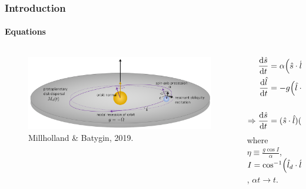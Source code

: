\documentclass[dvipsnames]{beamer}
\newcommand*{\rd}[2]{\frac{\mathrm{d}#1}{\mathrm{d}#2}}
\DeclarePairedDelimiter\p{\lparen}{\rparen}
\begin{document}
\begin{frame}
    \frametitle{Introduction}
    \framesubtitle{Equations}

    \begin{columns}
        \begin{column}{0.5\textwidth}
            \begin{figure}[t]
                \centering
                \includegraphics[width=\textwidth]{../GM_190913/1millholland_disk.png}
                \caption{Millholland \& Batygin, 2019.}
            \end{figure}
        \end{column}
        \begin{column}{0.5\textwidth}
            \begin{align*}
                \rd{\hat{s}}{t} &= \alpha \p*{\hat{s} \cdot \hat{l}_d}
                    \p*{\hat{s} \times \hat{l}_d},\\
                \rd{\hat{l}}{t} &= -g\p*{\hat{l} \cdot \hat{l}_d}
                    \p*{\hat{l} \times \hat{l}_d},\\
                \\
                \Rightarrow \rd{\hat{s}}{t}
                    &= \p{\hat{s} \cdot \hat{l}}
                        \p{\hat{s} \times \hat{l}}
                    - \eta\p{\hat{s} \times \hat{l}_d}.
            \end{align*}
            where $\eta \equiv \frac{g\cos I}{\alpha}$, $I =
            \cos^{-1}\p*{\hat{l}_d \cdot \hat{l}}$, $\alpha t \to t$.
        \end{column}
    \end{columns}
\end{frame}
\end{document}
